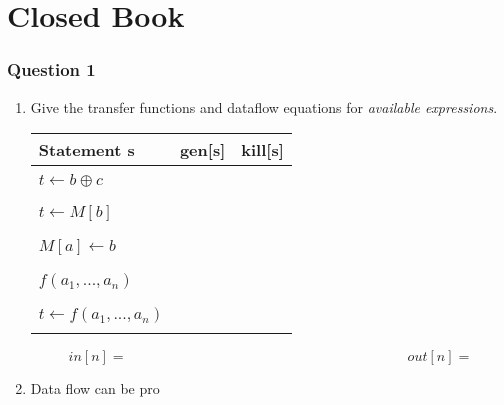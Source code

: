 \documentclass{report}
\begin{document}

\part{Closed Book}
\section*{Question 1}
\begin{enumerate}
    \item Give the transfer functions and dataflow equations for \textit{available expressions}.

    \begin{table}[ht]
        \centering
        \begin{tabular}{|l| l| l|}
            \hline
            Statement s & gen[s] & kill[s] \\
            \hline
             & & \\[1ex]
            $t \leftarrow b \oplus c$ & & \\
            & & \\[1ex]
            \hline
            & & \\[1ex]
            $t \leftarrow M[b]$ & & \\
            & & \\[1ex]
            \hline
            & & \\[1ex]
            $M[a] \leftarrow b$ & & \\
            & & \\[1ex]
            \hline
            & & \\[1ex]
            $f(a_1, ..., a_n)$ & & \\
            & & \\[1ex]
            \hline
            & & \\[1ex]
            $t \leftarrow f(a_1, ..., a_n)$ & & \\
            & & \\[1ex]
            \hline
        \end{tabular}
    \end{table}
    
    $$in[n] = \qquad\qquad\qquad\qquad\qquad\qquad\qquad\qquad\qquad\qquad out[n] = $$

    \item Data flow can be pro
\end{enumerate}
\end{document}
